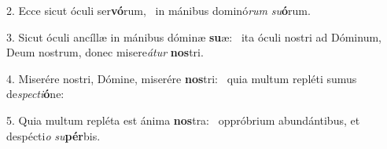 2. Ecce sicut óculi ser\textbf{vó}rum, \ast\  in mánibus dominó\textit{rum} \textit{su}\textbf{ó}rum.\

3. Sicut óculi ancíllæ in mánibus dóminæ \textbf{su}æ: \ast\  ita óculi nostri ad Dóminum, Deum nostrum, donec misere\textit{á}\textit{tur} \textbf{nos}tri.\

4. Miserére nostri, Dómine, miserére \textbf{nos}tri: \ast\  quia multum repléti sumus de\textit{spec}\textit{ti}\textbf{ó}ne:\

5. Quia multum repléta est ánima \textbf{nos}tra: \ast\  oppróbrium abundántibus, et despécti\textit{o} \textit{su}\textbf{pér}bis.\

